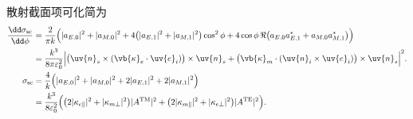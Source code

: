 \begin{exbox}
	散射截面项可化简为
	\begin{align*}
		\frac{\dd \sigma_{\mathrm{sc}}}{\dd \phi} &= \frac{2}{\pi k}\Bigl(|a_{E,0}|^{2}+|a_{M,0}|^{2}+4\bigl(|a_{E,1}|^{2}+|a_{M,1}|^{2}\bigr)\cos^{2}\phi + 4\cos\phi\,\Re\bigl(a_{E,0}a_{E,1}^{*}+a_{M,0}a_{M,1}^{*}\bigr)\Bigr) \\&= \frac{k^{3}}{8\pi\varepsilon_{0}^{2}}\Bigl|\bigl(\uv{n}_{s}\times(\vb{\kappa}_{e}\cdot\uv{e}_{i})\bigr)\times\uv{n}_{s} + \bigl(\vb{\kappa}_{m}\cdot(\uv{n}_{i}\times\uv{e}_{i})\bigr)\times\uv{n}_{s}\Bigr|^{2}.\\
		\sigma_{\mathrm{sc}} &= \frac{4}{k}\Bigl(|a_{E,0}|^{2}+|a_{M,0}|^{2}+2|a_{E,1}|^{2}+2|a_{M,1}|^{2}\Bigr) \\&= \frac{k^{3}}{8\varepsilon_{0}^{2}}\Bigl(\bigl(2|\kappa_{e\parallel}|^{2}+|\kappa_{m\perp}|^{2}\bigr)|A^{\mathrm{TM}}|^{2} + \bigl(2|\kappa_{m\parallel}|^{2}+|\kappa_{e\perp}|^{2}\bigr)|A^{\mathrm{TE}}|^{2}\Bigr).
	\end{align*}


\end{exbox}
